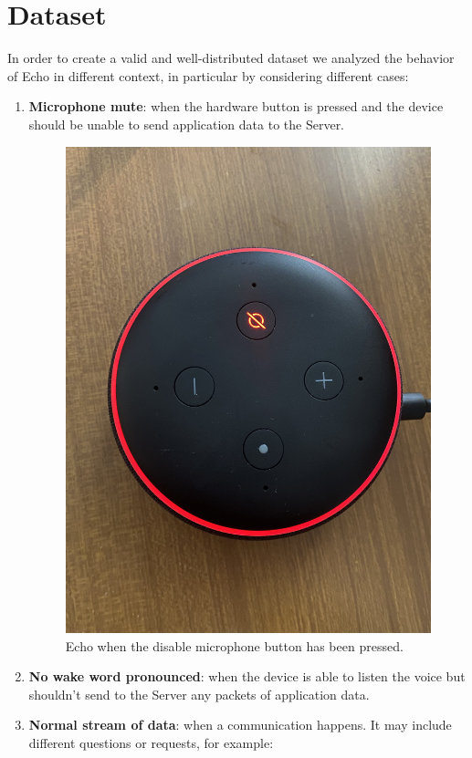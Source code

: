 \documentclass[sigconf]{acmart}
\begin{document}
    \section{Dataset}
    In order to create a valid and well-distributed dataset we analyzed the behavior of Echo in different context, in particular by considering different cases:
    \begin{enumerate}
        \item \textbf{Microphone mute}: when the hardware button is pressed and the device should be unable to send application data to the Server.
        \begin{figure}[h!]
            \includegraphics[width=0.8\linewidth]{img/alexa_red.jpg}
            \caption{Echo when the disable microphone button has been pressed.}
            \label{fig:Alexa_red_led}
        \end{figure}
        \item \textbf{No wake word pronounced}: when the device is able to listen the voice but shouldn't send to the Server any packets of application data.
        \item \textbf{Normal stream of data}: when a communication happens.
        It may include different questions or requests, for example:
        \begin{enumerate}

\end{enumerate}
\end{enumerate}
\end{document}
